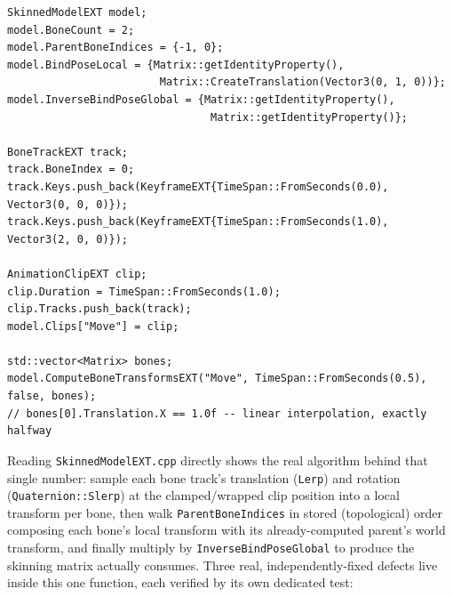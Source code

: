 \begin{lstlisting}
SkinnedModelEXT model;
model.BoneCount = 2;
model.ParentBoneIndices = {-1, 0};
model.BindPoseLocal = {Matrix::getIdentityProperty(),
                        Matrix::CreateTranslation(Vector3(0, 1, 0))};
model.InverseBindPoseGlobal = {Matrix::getIdentityProperty(),
                                Matrix::getIdentityProperty()};

BoneTrackEXT track;
track.BoneIndex = 0;
track.Keys.push_back(KeyframeEXT{TimeSpan::FromSeconds(0.0), Vector3(0, 0, 0)});
track.Keys.push_back(KeyframeEXT{TimeSpan::FromSeconds(1.0), Vector3(2, 0, 0)});

AnimationClipEXT clip;
clip.Duration = TimeSpan::FromSeconds(1.0);
clip.Tracks.push_back(track);
model.Clips["Move"] = clip;

std::vector<Matrix> bones;
model.ComputeBoneTransformsEXT("Move", TimeSpan::FromSeconds(0.5), false, bones);
// bones[0].Translation.X == 1.0f -- linear interpolation, exactly halfway
\end{lstlisting}

Reading \texttt{SkinnedModelEXT.cpp} directly shows the real algorithm behind that single
number: sample each bone track's translation (\texttt{Lerp}) and rotation
(\texttt{Quaternion::Slerp}) at the clamped/wrapped clip position into a local transform per
bone, then walk \texttt{ParentBoneIndices} in stored (topological) order composing each bone's
local transform with its already-computed parent's world transform, and finally multiply by
\texttt{InverseBindPoseGlobal} to produce the skinning matrix  actually
consumes. Three real, independently-fixed defects live inside this one function, each verified
by its own dedicated test:

